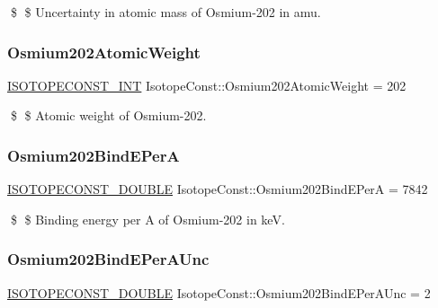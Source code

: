 \$ \$ Uncertainty in atomic mass of Osmium-\/202 in amu. \mbox{\label{group___isotope_const-_osmium-_os202_ga24668aa039cf7981f9346193b29972a8}} 
\subsubsection{\texorpdfstring{Osmium202\+Atomic\+Weight}{Osmium202AtomicWeight}}
{\footnotesize\ttfamily \mbox{\hyperlink{group___isotope_const-_macros_ga5f18360b3e99483a35c32d789e62621c}{I\+S\+O\+T\+O\+P\+E\+C\+O\+N\+S\+T\+\_\+\+I\+NT}} Isotope\+Const\+::\+Osmium202\+Atomic\+Weight = 202}

\$ \$ Atomic weight of Osmium-\/202. \mbox{\label{group___isotope_const-_osmium-_os202_ga34dbbc7510856dd3c8524faaba2b309d}} 
\subsubsection{\texorpdfstring{Osmium202\+Bind\+E\+PerA}{Osmium202BindEPerA}}
{\footnotesize\ttfamily \mbox{\hyperlink{group___isotope_const-_macros_ga8f45a7272ce02c0b4c65c44636ed719a}{I\+S\+O\+T\+O\+P\+E\+C\+O\+N\+S\+T\+\_\+\+D\+O\+U\+B\+LE}} Isotope\+Const\+::\+Osmium202\+Bind\+E\+PerA = 7842}

\$ \$ Binding energy per A of Osmium-\/202 in keV. \mbox{\label{group___isotope_const-_osmium-_os202_ga4019a84816d6ce63a7b66a3f4e330589}} 
\subsubsection{\texorpdfstring{Osmium202\+Bind\+E\+Per\+A\+Unc}{Osmium202BindEPerAUnc}}
{\footnotesize\ttfamily \mbox{\hyperlink{group___isotope_const-_macros_ga8f45a7272ce02c0b4c65c44636ed719a}{I\+S\+O\+T\+O\+P\+E\+C\+O\+N\+S\+T\+\_\+\+D\+O\+U\+B\+LE}} Isotope\+Const\+::\+Osmium202\+Bind\+E\+Per\+A\+Unc = 2}

